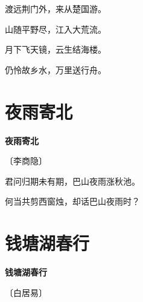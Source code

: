 \documentclass[12pt,UTF-8,openany,fontset=none]{ctexbook}
\begin{document}
\begin{center}
    \begin{Large}

        渡远荆门外，来从楚国游。

        山随平野尽，江入大荒流。

        月下飞天镜，云生结海楼。

        仍怜故乡水，万里送行舟。

    \end{Large}

\end{center}

\vspace{8pt}
\clearpage

\section{夜雨寄北}


\begin{center}
    {\bfseries 夜雨寄北}

    \vspace{18pt}

    \begin{large}\xuwen
        〔李商隐〕
    \end{large}

\end{center}

    \vspace{18pt}

\begin{center}
    \begin{Large}

        君问归期未有期，巴山夜雨涨秋池。

        何当共剪西窗烛，却话巴山夜雨时？

    \end{Large}

\end{center}

\vspace{8pt}
\clearpage

\section{钱塘湖春行}


\begin{center}
    {\bfseries 钱塘湖春行}

    \vspace{18pt}

    \begin{large}\xuwen
        〔白居易〕
    \end{large}

\end{center}
\end{document}
